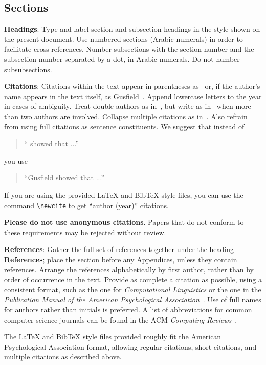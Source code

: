 \documentclass[11pt]{article}
\begin{document}
\subsection{Sections}

{\bf Headings}: Type and label section and subsection headings in the
style shown on the present document.  Use numbered sections (Arabic
numerals) in order to facilitate cross references. Number subsections
with the section number and the subsection number separated by a dot,
in Arabic numerals. Do not number subsubsections.

{\bf Citations}: Citations within the text appear in parentheses
as~\cite{Gusfield:97} or, if the author's name appears in the text
itself, as Gusfield~.  Append lowercase letters
to the year in cases of ambiguity.  Treat double authors as
in~\cite{Aho:72}, but write as in~\cite{Chandra:81} when more than two
authors are involved. Collapse multiple citations as
in~\cite{Gusfield:97,Aho:72}. Also refrain from using full citations
as sentence constituents. We suggest that instead of
\begin{quote}
  ``\cite{Gusfield:97} showed that ...''
\end{quote}
you use
\begin{quote}
``Gusfield    showed that ...''
\end{quote}

If you are using the provided \LaTeX{} and Bib\TeX{} style files, you
can use the command \verb|\newcite| to get ``author (year)'' citations.

\textbf{Please do not use anonymous citations}.
Papers that do not conform to these requirements may be rejected without review.


\textbf{References}: Gather the full set of references together under
the heading {\bf References}; place the section before any Appendices,
unless they contain references. Arrange the references alphabetically
by first author, rather than by order of occurrence in the text.
Provide as complete a citation as possible, using a consistent format,
such as the one for {\em Computational Linguistics\/} or the one in the
{\em Publication Manual of the American
Psychological Association\/}~\cite{APA:83}.  Use of full names for
authors rather than initials is preferred.  A list of abbreviations
for common computer science journals can be found in the ACM
{\em Computing Reviews\/}~\cite{ACM:83}.

The \LaTeX{} and Bib\TeX{} style files provided roughly fit the
American Psychological Association format, allowing regular citations,
short citations, and multiple citations as described above.
\end{document}
